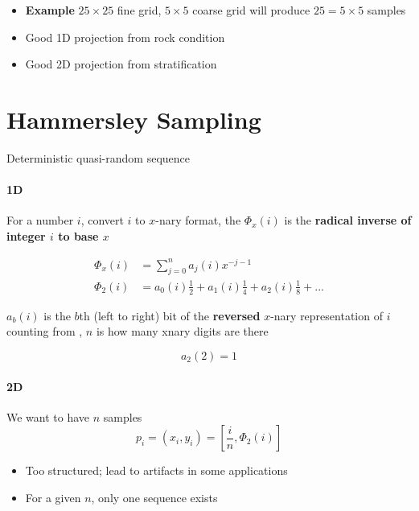   \begin{itemize}
    \item \textbf{Example} $ 25 \times 25 $ fine grid, $ 5 \times 5 $ coarse grid
    will produce $ 25 = 5 \times 5 $ samples
    \item Good 1D projection from rock condition
    \item Good 2D projection from stratification
  \end{itemize}

\section{Hammersley Sampling}

  Deterministic quasi-random sequence

  \paragraph{1D}
  For a number $ i $, convert $ i $ to $ x $-nary format, the
  $ \Phi_{x} \left( i \right) $ is the \textbf{radical inverse
  of integer $ i $ to base $ x $}

  \begin{align}
    \Phi_{x}\left( i \right)
      &= \sum_{j = 0}^{n} a_{j} \left( i \right) x^{-j - 1} \\
    \Phi_{2}\left( i \right)
      &= a_{0} \left( i \right) \frac{1}{2}
      + a_{1} \left( i \right) \frac{1}{4}
      + a_{2} \left( i \right) \frac{1}{8} + ...
  \end{align}

  $ a_{b}\left( i \right) $ is the $ b $th (left to right) bit of the
  \textbf{reversed} $ x $-nary representation of $ i $ counting from ,
  $ n $ is how many xnary digits are there

  \begin{displaymath}
    a_{2}\left( 2 \right) = 1
  \end{displaymath}

  \paragraph{2D} We want to have $ n $ samples
  \begin{equation}
    p_{i}
      = \left( x_{i}, y_{i} \right)
      = \left[ \frac{i}{n}, \Phi_{2}\left( i \right) \right]
  \end{equation}

  \begin{itemize}
    \item Too structured; lead to artifacts in some applications
    \item For a given $ n $, only one sequence exists
  \end{itemize}

